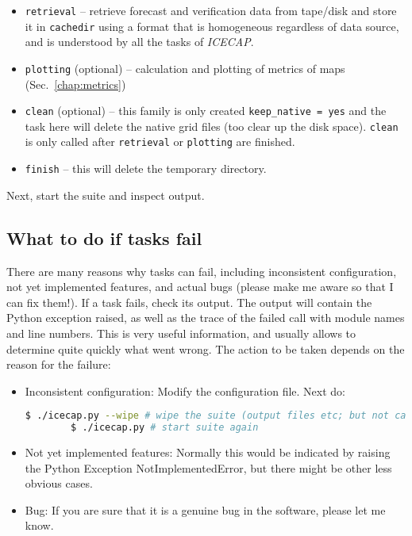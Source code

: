 \documentclass[DIV=10, parskip=full]{scrreprt}
\newcommand{\ice}{\textit{ICECAP}\xspace}
\begin{document}
\begin{itemize}
	\item \texttt{retrieval} -- retrieve forecast and verification data from tape/disk and store it in \texttt{cachedir} using a format that is homogeneous regardless of data source, and is understood by all the tasks of \ice. 
	\item \texttt{plotting} (optional) -- calculation and plotting of metrics of maps (Sec.\ \ref{chap:metrics})
	\item \texttt{clean} (optional) -- this family is only created \texttt{keep\_native = yes} and the task here will delete the native grid files (too clear up the disk space). \texttt{clean} is only called after \texttt{retrieval} or \texttt{plotting} are finished. 
	\item \texttt{finish} -- this will delete the temporary directory.
\end{itemize}

Next, start the suite and inspect output. 

\subsection{What to do if tasks fail}
There are many reasons why tasks can fail, including inconsistent configuration, not yet implemented features, and actual bugs (please make me aware so that I can fix them!). If a task fails, check its output. The output will contain the Python exception raised, as well as the trace of the failed call with module names and line numbers. This is very useful information, and usually allows to determine quite quickly what went wrong. The action to be taken depends on the reason for the failure:
\begin{itemize}
	\item Inconsistent configuration: Modify the configuration file. Next do:
		\begin{lstlisting}[language=bash, float]
		$ ./icecap.py --wipe # wipe the suite (output files etc; but not cache)
		$ ./icecap.py # start suite again
	\end{lstlisting}
	\item Not yet implemented features: Normally this would be indicated by raising the Python Exception NotImplementedError, but there might be other less obvious cases.
	\item Bug: If you are sure that it is a genuine bug in the software, please let me know.
\end{itemize}
\end{document}
